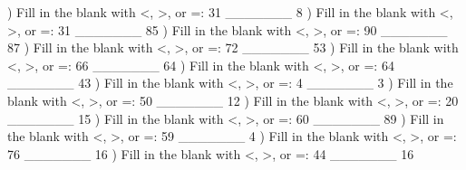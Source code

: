 \documentclass{article}%
\begin{document}
) Fill in the blank with <, >, or =: 31 \_\_\_\_\_\_\_ 8%
\newline%
\newline%
) Fill in the blank with <, >, or =: 31 \_\_\_\_\_\_\_ 85%
\newline%
\newline%
) Fill in the blank with <, >, or =: 90 \_\_\_\_\_\_\_ 87%
\newline%
\newline%
) Fill in the blank with <, >, or =: 72 \_\_\_\_\_\_\_ 53%
\newline%
\newline%
) Fill in the blank with <, >, or =: 66 \_\_\_\_\_\_\_ 64%
\newline%
\newline%
) Fill in the blank with <, >, or =: 64 \_\_\_\_\_\_\_ 43%
\newline%
\newline%
) Fill in the blank with <, >, or =: 4 \_\_\_\_\_\_\_ 3%
\newline%
\newline%
) Fill in the blank with <, >, or =: 50 \_\_\_\_\_\_\_ 12%
\newline%
\newline%
) Fill in the blank with <, >, or =: 20 \_\_\_\_\_\_\_ 15%
\newline%
\newline%
) Fill in the blank with <, >, or =: 60 \_\_\_\_\_\_\_ 89%
\newline%
\newline%
) Fill in the blank with <, >, or =: 59 \_\_\_\_\_\_\_ 4%
\newline%
\newline%
) Fill in the blank with <, >, or =: 76 \_\_\_\_\_\_\_ 16%
\newline%
\newline%
) Fill in the blank with <, >, or =: 44 \_\_\_\_\_\_\_ 16%
\end{document}
